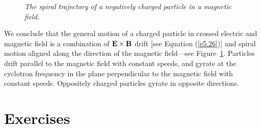 \begin{figure}[h]
\epsfysize=1in
\centerline{}
\caption{\em The spiral trajectory of a negatively charged particle in a magnetic field.}\label{f5.3}
\end{figure}

We conclude that the general motion of a charged particle in crossed
electric and magnetic field is a combination of ${\bf E}\times{\bf B}$
drift [see Equation (\ref{e5.26})] and spiral motion aligned along the
direction of the magnetic field---see Figure~\ref{f5.3}. Particles drift parallel to the magnetic field
with constant speeds, and gyrate at the cyclotron frequency in the plane perpendicular to the magnetic field with constant speeds.
Oppositely charged particles gyrate in opposite directions.

\section{Exercises}
